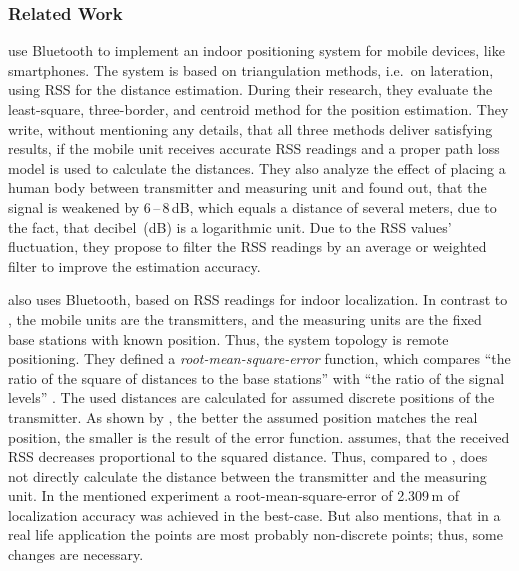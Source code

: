 \subsubsection*{Related Work}
\citet{wang:bt_pos} use Bluetooth to implement an indoor positioning system for mobile devices, like smartphones. The system is based on triangulation methods, i.e.\ on lateration, using \ac{RSS} for the distance estimation. During their research, they evaluate the least-square, three-border, and centroid method for the position estimation. They write, without mentioning any details, that all three methods deliver satisfying results, if the mobile unit receives accurate \ac{RSS} readings and a proper path loss model is used to calculate the distances. They also analyze the effect of placing a human body between transmitter and measuring unit and found out, that the signal is weakened by 6\,--\,8\,dB, which equals a distance of several meters, due to the fact, that decibel~(dB) is a logarithmic unit. Due to the \ac{RSS} values' fluctuation, they propose to filter the \ac{RSS} readings by an average or weighted filter to improve the estimation accuracy.

\citet{oksar:bluetooth} also uses Bluetooth, based on \ac{RSS} readings for indoor localization. In contrast to \citet{wang:bt_pos}, the mobile units are the transmitters, and the measuring units are the fixed base stations with known position. Thus, the system topology is remote positioning. They defined a \emph{root-mean-square-error} function, which compares ``the ratio of the square of distances to the base stations'' with ``the ratio of the signal levels'' \citep{oksar:bluetooth}. The used distances are calculated for assumed discrete positions of the transmitter. As shown by \citet{oksar:bluetooth}, the better the assumed position matches the real position, the smaller is the result of the error function. \citet{oksar:bluetooth} assumes, that the received \ac{RSS} decreases proportional to the squared distance. Thus, compared to \citet{wang:bt_pos}, \citet{oksar:bluetooth} does not directly calculate the distance between the transmitter and the measuring unit. In the mentioned experiment a root-mean-square-error of 2.309\,m of localization accuracy was achieved in the best-case. But \citet{oksar:bluetooth} also mentions, that in a real life application the points are most probably non-discrete points; thus, some changes are necessary.

